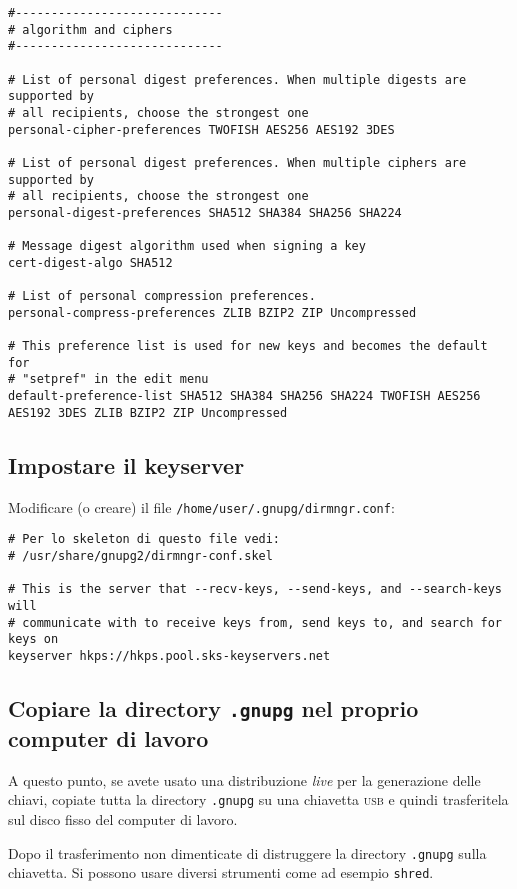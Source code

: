\begin{lstlisting}
#-----------------------------
# algorithm and ciphers
#-----------------------------

# List of personal digest preferences. When multiple digests are supported by
# all recipients, choose the strongest one
personal-cipher-preferences TWOFISH AES256 AES192 3DES

# List of personal digest preferences. When multiple ciphers are supported by
# all recipients, choose the strongest one
personal-digest-preferences SHA512 SHA384 SHA256 SHA224

# Message digest algorithm used when signing a key
cert-digest-algo SHA512

# List of personal compression preferences.
personal-compress-preferences ZLIB BZIP2 ZIP Uncompressed

# This preference list is used for new keys and becomes the default for
# "setpref" in the edit menu
default-preference-list SHA512 SHA384 SHA256 SHA224 TWOFISH AES256 AES192 3DES ZLIB BZIP2 ZIP Uncompressed
\end{lstlisting}

\subsection{Impostare il keyserver}

Modificare (o creare) il file \texttt{/home/user/.gnupg/dirmngr.conf}:

\begin{lstlisting}
# Per lo skeleton di questo file vedi:
# /usr/share/gnupg2/dirmngr-conf.skel

# This is the server that --recv-keys, --send-keys, and --search-keys will
# communicate with to receive keys from, send keys to, and search for keys on
keyserver hkps://hkps.pool.sks-keyservers.net
\end{lstlisting}

\subsection{Copiare la directory \texttt{.gnupg} nel proprio computer di lavoro}

A questo punto, se avete usato una distribuzione \textit{live} per la
generazione delle chiavi, copiate tutta la directory \texttt{.gnupg} su una
chiavetta \textsc{usb} e quindi trasferitela sul disco fisso del computer di
lavoro.

Dopo il trasferimento non dimenticate di distruggere la directory
\texttt{.gnupg} sulla chiavetta. Si possono usare diversi strumenti come ad
esempio \texttt{shred}.


